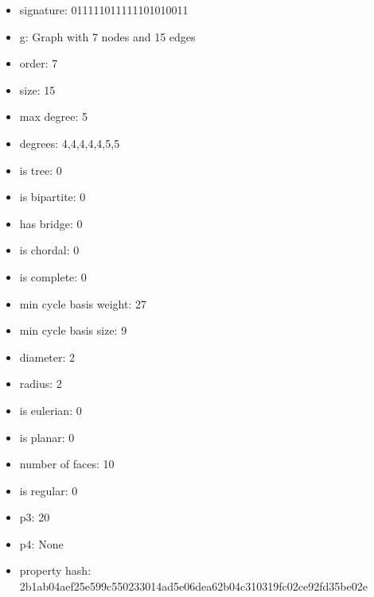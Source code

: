 \begin{itemize}
\item signature: 011111011111101010011
\item g: Graph with 7 nodes and 15 edges
\item order: 7
\item size: 15
\item max degree: 5
\item degrees: 4,4,4,4,4,5,5
\item is tree: 0
\item is bipartite: 0
\item has bridge: 0
\item is chordal: 0
\item is complete: 0
\item min cycle basis weight: 27
\item min cycle basis size: 9
\item diameter: 2
\item radius: 2
\item is eulerian: 0
\item is planar: 0
\item number of faces: 10
\item is regular: 0
\item p3: 20
\item p4: None
\item property hash: 2b1ab04aef25e599c550233014ad5e06dea62b04c310319fc02ce92fd35be02e
\end{itemize}
\newpage
\begin{figure}
\end{figure}
